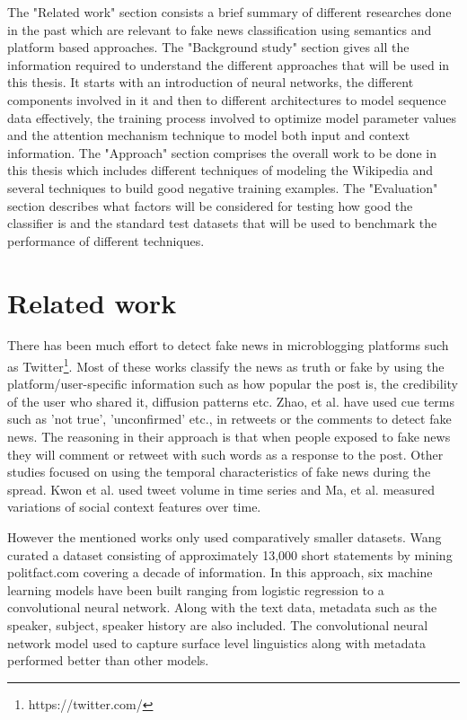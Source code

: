 \documentclass[a4paper, 11pt]{article}
\begin{document}
The "Related work" section consists a brief summary of different researches done in the past which are relevant to fake news classification using semantics and platform based approaches. The "Background study" section gives all the information required to understand the different approaches that will be used in this thesis. It starts with an introduction of neural networks, the different components involved in it and then to different architectures to model sequence data effectively, the training process involved to optimize model parameter values and the attention mechanism technique to model both input and context information. The "Approach" section comprises the overall work to be done in this thesis which includes different techniques of modeling the Wikipedia and several techniques to build good negative training examples. The "Evaluation" section describes what factors will be considered for testing how good the classifier is and the standard test datasets that will be used to benchmark the performance of different techniques. 
\section{Related work}


There has been much effort to detect fake news in microblogging platforms such as Twitter\footnote{https://twitter.com/}. Most of these works \cite{Liu2015} \cite{Ma2015}classify the news as truth or fake by using the platform/user-specific information such as how popular the post is, the credibility of the user who shared it, diffusion patterns etc. Zhao, et al. \cite{Zhao2015} have used cue terms such as 'not true', 'unconfirmed' etc., in retweets or the comments to detect fake news. The reasoning in their approach is that when people exposed to fake news they will comment or retweet with such words as a response to the post. Other studies focused on using the temporal characteristics of fake news during the spread. Kwon et al.\cite{Kwon2013} used tweet volume in time series and Ma, et al.\cite{Ma2015} measured variations of social context features over time. 

However the mentioned works only used comparatively smaller datasets. Wang \cite{Wang2017} curated a dataset consisting of approximately 13,000 short statements by mining politfact.com covering a decade of information. In this approach, six machine learning models have been built ranging from logistic regression to a convolutional neural network. Along with the text data, metadata such as the speaker, subject, speaker history are also included. The convolutional neural network model used to capture surface level linguistics along with metadata performed better than other models.
\end{document}
